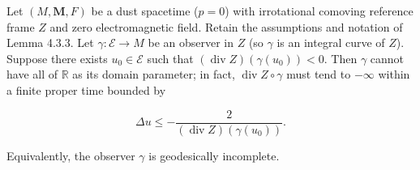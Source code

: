 Let $(M, \mathbf{M}, F)$ be a dust spacetime ($p = 0$) with irrotational comoving reference frame $Z$ and zero electromagnetic field. Retain the assumptions and notation of Lemma 4.3.3. Let $\gamma: \mathcal{E} \to M$ be an observer in $Z$ (so $\gamma$ is an integral curve of $Z$). Suppose there exists $u_0 \in \mathcal{E}$ such that $(\operatorname{div} Z)(\gamma(u_0)) < 0$. Then $\gamma$ cannot have all of $\mathbb{R}$ as its domain parameter; in fact, $\operatorname{div} Z \circ \gamma$ must tend to $-\infty$ within a finite proper time bounded by

$$
\Delta u \leq -\frac{2}{(\operatorname{div} Z)(\gamma(u_0))}.
$$

Equivalently, the observer $\gamma$ is geodesically incomplete.
